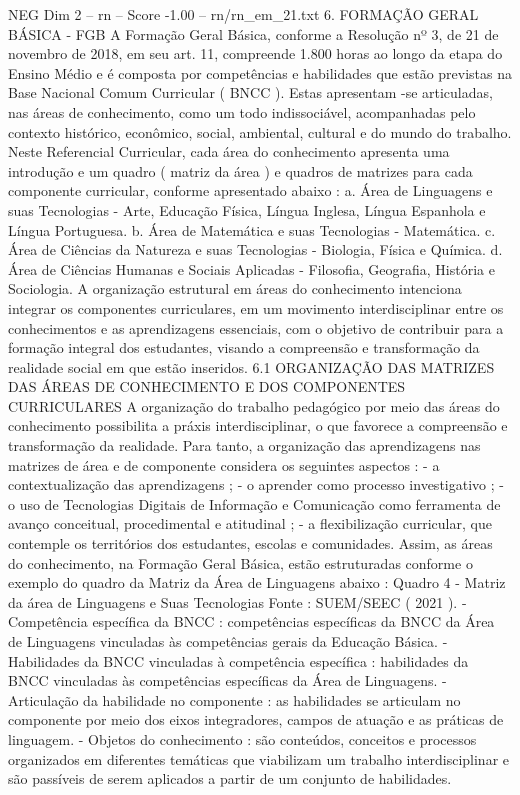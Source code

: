 \begin{textsample}{NEG Dim 2 – rn – Score -1.00 – rn/rn\_em\_21.txt}  \label{ex:f2_neg_046}
6.
FORMAÇÃO GERAL BÁSICA - FGB A Formação Geral Básica, conforme a Resolução nº 3, de 21 de novembro de 2018, em seu art. 11, compreende 1.800 horas ao longo da etapa do Ensino Médio e é composta por competências e habilidades que estão previstas na Base Nacional Comum Curricular ( BNCC ).
Estas apresentam -se articuladas, nas áreas de conhecimento, como um todo indissociável, acompanhadas pelo contexto histórico, econômico, social, ambiental, cultural e do mundo do trabalho.
Neste Referencial Curricular, cada área do conhecimento apresenta uma introdução e um quadro ( matriz da área ) e quadros de matrizes para cada componente curricular, conforme apresentado abaixo : a.
Área de Linguagens e suas Tecnologias - Arte, Educação Física, Língua Inglesa, Língua Espanhola e Língua Portuguesa. b.
Área de Matemática e suas Tecnologias - Matemática. c.
Área de Ciências da Natureza e suas Tecnologias - Biologia, Física e Química. d.
Área de Ciências Humanas e Sociais Aplicadas - Filosofia, Geografia, História e Sociologia.
A organização estrutural em áreas do conhecimento intenciona integrar os componentes curriculares, em um movimento interdisciplinar entre os conhecimentos e as aprendizagens essenciais, com o objetivo de contribuir para a formação integral dos estudantes, visando a compreensão e transformação da realidade social em que estão inseridos. 6.1 ORGANIZAÇÃO DAS MATRIZES DAS ÁREAS DE CONHECIMENTO E DOS COMPONENTES CURRICULARES A organização do trabalho pedagógico por meio das áreas do conhecimento possibilita a práxis interdisciplinar, o que favorece a compreensão e transformação da realidade.
Para tanto, a organização das aprendizagens nas matrizes de área e de componente considera os seguintes aspectos : - a contextualização das aprendizagens ; - o aprender como processo investigativo ; - o uso de Tecnologias Digitais de Informação e Comunicação como ferramenta de avanço conceitual, procedimental e atitudinal ; - a flexibilização curricular, que contemple os territórios dos estudantes, escolas e comunidades.
Assim, as áreas do conhecimento, na Formação Geral Básica, estão estruturadas conforme o exemplo do quadro da Matriz da Área de Linguagens abaixo : Quadro 4 - Matriz da área de Linguagens e Suas Tecnologias Fonte : SUEM/SEEC ( 2021 ). - Competência específica da BNCC : competências específicas da BNCC da Área de Linguagens vinculadas às competências gerais da Educação Básica. - Habilidades da BNCC vinculadas à competência específica : habilidades da BNCC vinculadas às competências específicas da Área de Linguagens. - Articulação da habilidade no componente : as habilidades se articulam no componente por meio dos eixos integradores, campos de atuação e as práticas de linguagem. - Objetos do conhecimento : são conteúdos, conceitos e processos organizados em diferentes temáticas que viabilizam um trabalho interdisciplinar e são passíveis de serem aplicados a partir de um conjunto de habilidades.

\end{textsample}
